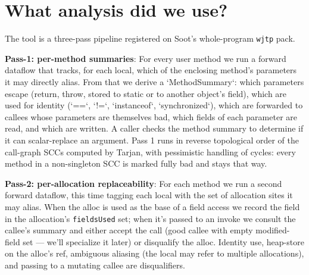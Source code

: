 \documentclass[12pt,a4paper]{article}
\begin{document}


\section{What analysis did we use?}

The tool is a three-pass pipeline registered on Soot's whole-program \texttt{wjtp} pack.

\textbf{Pass-1: per-method summaries}: For every user method we run a forward
dataflow that tracks, for each local, which of the enclosing method's
parameters it may directly alias. From that we derive a `MethodSummary`:
which parameters escape (return, throw, stored to static or to another
object's field), which are used for identity (`==`, `!=`, `instanceof`,
`synchronized`), which are forwarded to callees whose parameters are
themselves bad, which fields of each parameter are read, and which are
written. A caller checks the method summary to determine if it can scalar-replace an argument. Pass 1 runs in reverse topological order of the call-graph SCCs
computed by Tarjan, with pessimistic handling of cycles: every method in a
non-singleton SCC is marked fully bad and stays that way.

\textbf{Pass-2: per-allocation replaceability}: For each method we run a
second forward dataflow, this time tagging each local with the set of
allocation sites it may alias. When the alloc is used as the base of a
field access we record the field in the allocation's \texttt{fieldsUsed} set; when
it's passed to an invoke we consult the callee's summary and either accept
the call (good callee with empty modified-field set — we'll specialize it
later) or disqualify the alloc. Identity use, heap-store on the alloc's
ref, ambiguous aliasing (the local may refer to multiple allocations), and
passing to a mutating callee are disqualifiers.
\end{document}
